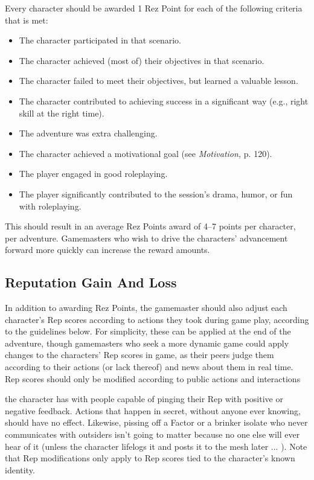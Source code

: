 Every character should be awarded 1 Rez Point for each of the following criteria that is met: \begin{itemize} \item The character participated in that scenario. \item The character achieved (most of) their objectives in that scenario. \item The character failed to meet their objectives, but learned a valuable lesson. \item The character contributed to achieving success in a significant way (e.g., right skill at the right time). \item The adventure was extra challenging. \item The character achieved a motivational goal (see \textit{Motivation,} p. 120). \item The player engaged in good roleplaying. \item The player significantly contributed to the session's drama, humor, or fun with roleplaying. \end{itemize} 

This should result in an average Rez Points award of 4–7 points per character, per adventure. Gamemasters who wish to drive the characters' advancement forward more quickly can increase the reward amounts. 

\subsection{Reputation Gain And Loss} 

In addition to awarding Rez Points, the gamemaster should also adjust each character's Rep scores according to actions they took during game play, according to the guidelines below. For simplicity, these can be applied at the end of the adventure, though gamemasters who seek a more dynamic game could apply changes to the characters' Rep scores in game, as their peers judge them according to their actions (or lack thereof) and news about them in real time. Rep scores should only be modified according to public actions and interactions 

the character has with people capable of pinging their Rep with positive or negative feedback. Actions that happen in secret, without anyone ever knowing, should have no effect. Likewise, pissing off a Factor or a brinker isolate who never communicates with outsiders isn't going to matter because no one else will ever hear of it (unless the character lifelogs it and posts it to the mesh later ... ). Note that Rep modifications only apply to Rep scores tied to the character's known identity. 

